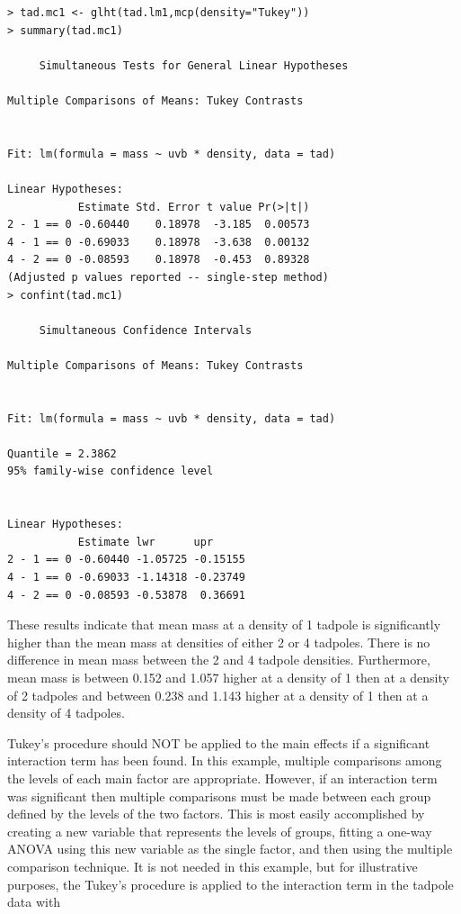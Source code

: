 \documentclass[10pt,openany]{book}\usepackage[]{graphicx}\usepackage[]{color}
\makeatletter
\newenvironment{kframe}{%
 \def\at@end@of@kframe{}%
 \ifinner\ifhmode%
  \def\at@end@of@kframe{\end{minipage}}%
  \begin{minipage}{\columnwidth}%
 \fi\fi%
 \def\FrameCommand##1{\hskip\@totalleftmargin \hskip-\fboxsep
 \colorbox{shadecolor}{##1}\hskip-\fboxsep
     \hskip-\linewidth \hskip-\@totalleftmargin \hskip\columnwidth}%
 \MakeFramed {\advance\hsize-\width
   \@totalleftmargin\z@ \linewidth\hsize
   \@setminipage}}%
 {\par\unskip\endMakeFramed%
 \at@end@of@kframe}
\newenvironment{knitrout}{}{} %
\makeatother
\begin{document}
\begin{knitrout}
\color{fgcolor}\begin{kframe}
\begin{verbatim}
> tad.mc1 <- glht(tad.lm1,mcp(density="Tukey"))
> summary(tad.mc1)

	 Simultaneous Tests for General Linear Hypotheses

Multiple Comparisons of Means: Tukey Contrasts


Fit: lm(formula = mass ~ uvb * density, data = tad)

Linear Hypotheses:
           Estimate Std. Error t value Pr(>|t|)
2 - 1 == 0 -0.60440    0.18978  -3.185  0.00573
4 - 1 == 0 -0.69033    0.18978  -3.638  0.00132
4 - 2 == 0 -0.08593    0.18978  -0.453  0.89328
(Adjusted p values reported -- single-step method)
> confint(tad.mc1)

	 Simultaneous Confidence Intervals

Multiple Comparisons of Means: Tukey Contrasts


Fit: lm(formula = mass ~ uvb * density, data = tad)

Quantile = 2.3862
95% family-wise confidence level
 

Linear Hypotheses:
           Estimate lwr      upr     
2 - 1 == 0 -0.60440 -1.05725 -0.15155
4 - 1 == 0 -0.69033 -1.14318 -0.23749
4 - 2 == 0 -0.08593 -0.53878  0.36691
\end{verbatim}
\end{kframe}
\end{knitrout}

These results indicate that mean mass at a density of 1 tadpole is significantly higher than the mean mass at densities of either 2 or 4 tadpoles.  There is no difference in mean mass between the 2 and 4 tadpole densities.  Furthermore, mean mass is between 0.152 and 1.057 higher at a density of 1 then at a density of 2 tadpoles and between 0.238 and 1.143 higher at a density of 1 then at a density of 4 tadpoles.

Tukey's procedure should NOT be applied to the main effects if a significant interaction term has been found.  In this example, multiple comparisons among the levels of each main factor are appropriate.  However, if an interaction term was significant then multiple comparisons must be made between each group defined by the levels of the two factors.  This is most easily accomplished by creating a new variable that represents the levels of groups, fitting a one-way ANOVA using this new variable as the single factor, and then using the multiple comparison technique.  It is not needed in this example, but for illustrative purposes, the Tukey's procedure is applied to the interaction term in the tadpole data with
\end{document}
